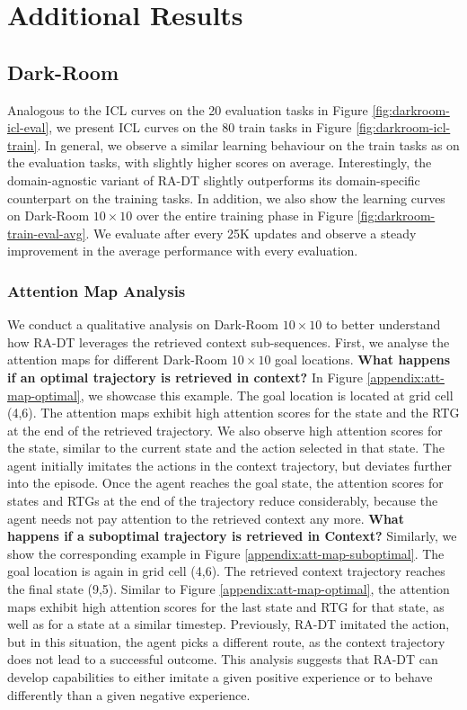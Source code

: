 \documentclass{article}
\begin{document}
\section{Additional Results}\label{appendix:results}
\subsection{Dark-Room}\label{appendix:expdetails-darkroom}
Analogous to the ICL curves on the 20 evaluation tasks in Figure \ref{fig:darkroom-icl-eval}, we present ICL curves on the 80 train tasks in Figure \ref{fig:darkroom-icl-train}.
In general, we observe a similar learning behaviour on the train tasks as on the evaluation tasks, with slightly higher scores on average.
Interestingly, the domain-agnostic variant of RA-DT slightly outperforms its domain-specific counterpart on the training tasks.
In addition, we also show the learning curves on Dark-Room $10\times 10$ over the entire training phase in Figure \ref{fig:darkroom-train-eval-avg}.
We evaluate after every 25K updates and observe a steady improvement in the average performance with every evaluation.
\subsubsection{Attention Map Analysis}\label{appendix:attn-maps}
We conduct a qualitative analysis on Dark-Room $10\times10$ to better understand how RA-DT leverages the retrieved context sub-sequences.
First, we analyse the attention maps for different Dark-Room $10\times10$ goal locations.
\textbf{What happens if an optimal trajectory is retrieved in context? }
In Figure \ref{appendix:att-map-optimal}, we showcase this example.
The goal location is located at grid cell (4,6).
The attention maps exhibit high attention scores for the state and the RTG at the end of the retrieved trajectory.
We also observe high attention scores for the state, similar to the current state and the action selected in that state.
The agent initially imitates the actions in the context trajectory, but deviates further into the episode.
Once the agent reaches the goal state, the attention scores for states and RTGs at the end of the trajectory reduce considerably, because the agent needs not pay attention to the retrieved context any more.
\textbf{What happens if a suboptimal trajectory is retrieved in Context?}
Similarly, we show the corresponding example in Figure \ref{appendix:att-map-suboptimal}.
The goal location is again in grid cell (4,6).
The retrieved context trajectory reaches the final state (9,5).
Similar to Figure \ref{appendix:att-map-optimal}, the attention maps exhibit high attention scores for the last state and RTG for that state, as well as for a state at a similar timestep.
Previously, RA-DT imitated the action, but in this situation, the agent
picks a different route, as the context trajectory does not lead to a successful outcome.
This analysis suggests that RA-DT can develop capabilities to either imitate a given positive experience or to behave differently than a given negative experience.
\end{document}
